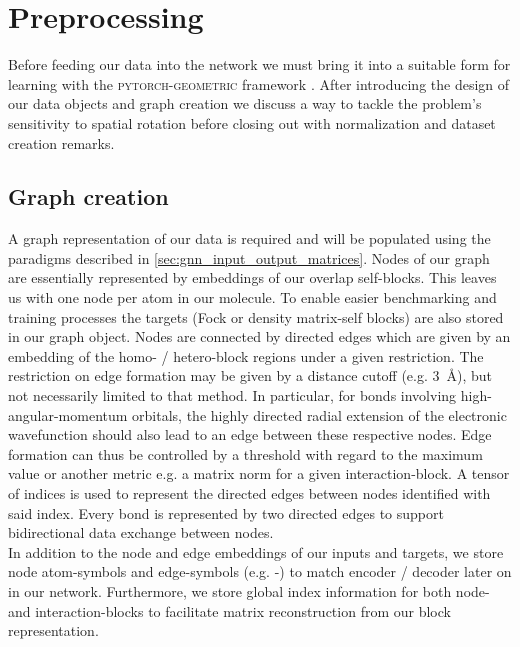 \section{Preprocessing}
\label{sec:gnn_preproc}
Before feeding our data into the network we must bring it into a suitable form for learning with the \textsc{pytorch-geometric} framework \parencite{ref:PyTorchGeometric, ref:PyTorch_geom_paper}. After introducing the design of our data objects and graph creation we discuss a way to tackle the problem's sensitivity to spatial rotation before closing out with normalization and dataset creation remarks. 
\subsection{Graph creation}
\label{subsec:gnn_graph_creation}
A graph representation of our data is required and will be populated using the paradigms described in \autoref{sec:gnn_input_output_matrices}. Nodes of our graph are essentially represented by embeddings of our overlap self-blocks. This leaves us with one node per atom in our molecule. To enable easier benchmarking and training processes the targets (Fock or density matrix-self blocks) are also stored in our graph object. Nodes are connected by directed edges which are given by an embedding of the homo- / hetero-block regions under a given restriction. The restriction on edge formation may be given by a distance cutoff (e.g. \SI{3}{\angstrom}), but not necessarily limited to that method. In particular, for bonds involving high-angular-momentum orbitals, the highly directed radial extension of the electronic wavefunction should also lead to an edge between these respective nodes. Edge formation can thus be controlled by a threshold with regard to the maximum value or another metric e.g. a matrix norm for a given interaction-block. A tensor of indices is used to represent the directed edges between nodes identified with said index. Every bond is represented by two directed edges to support bidirectional data exchange between nodes.\\

In addition to the node and edge embeddings of our inputs and targets, we store node atom-symbols and edge-symbols (e.g. -) to match encoder / decoder later on in our network. Furthermore, we store global index information for both node- and interaction-blocks to facilitate matrix reconstruction from our block representation. 

